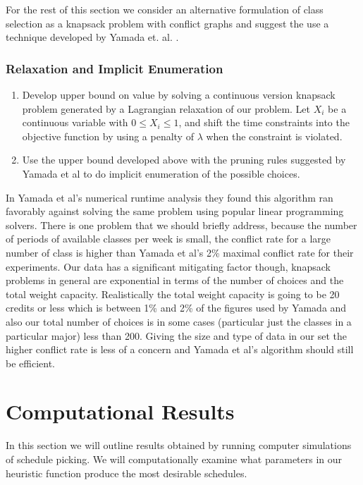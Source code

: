 \documentclass[11pt]{article} %
\begin{document}
For the rest of this section we consider an alternative formulation of class
selection as a knapsack problem with conflict graphs and suggest the use
a technique developed by Yamada et. al.  \cite{yamada:heuristic}.

\subsubsection{Relaxation and Implicit Enumeration} \begin{enumerate} \item
Develop upper bound on value by solving a continuous version knapsack problem
generated by a Lagrangian relaxation of our problem. Let $X_i$ be a continuous
variable with $0 \leq X_i \leq 1$, and shift the time constraints into the
objective function by using a penalty of $\lambda$ when the constraint is
violated.  \item Use the upper bound developed above with the pruning rules
suggested by Yamada et al \cite{yamada:heuristic} to do implicit enumeration of
the possible choices.  \end{enumerate}

In Yamada et al’s \cite{yamada:heuristic} numerical runtime analysis they found
this algorithm ran favorably against solving the same problem using popular
linear programming solvers. There is one problem that we should briefly address,
because the number of periods of available classes per week is small,
the conflict rate for a large number of class is higher than Yamada
et al’s 2\% maximal conflict rate for their experiments. Our data has
a significant mitigating factor though, knapsack problems in general are
exponential in terms of the number of choices and the total weight capacity.
Realistically the total weight capacity is going to be 20 credits or less which
is between 1\% and 2\% of the figures used by Yamada \cite{yamada:heuristic} and
also our total number of choices is in some cases (particular just the classes
in a particular major) less than 200. Giving the size and type of data in our
set the higher conflict rate is less of a concern and Yamada et al’s algorithm
should still be efficient.

\section{Computational Results} In this section we will outline results obtained
by running computer simulations of schedule picking. We will computationally
examine what parameters in our heuristic function produce the most desirable
schedules.

{}  
\end{document}
